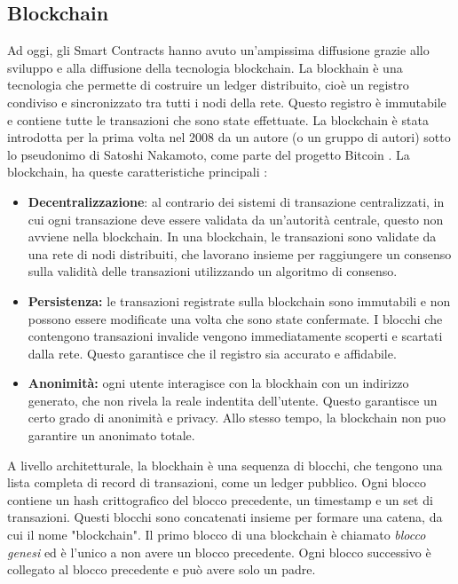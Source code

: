 \documentclass[../../Thesis.tex]{subfiles}
\begin{document}
\subsection{Blockchain}
Ad oggi, gli Smart Contracts hanno avuto un'ampissima diffusione grazie allo sviluppo  e alla diffusione della tecnologia blockchain. La blockhain è una tecnologia che permette di costruire un ledger distribuito, cioè un registro condiviso e sincronizzato tra tutti i nodi della rete. Questo registro è immutabile e contiene tutte le transazioni che sono state effettuate. La blockchain è stata introdotta per la prima volta nel 2008 da un autore (o un gruppo di autori) sotto lo pseudonimo di Satoshi Nakamoto, come parte del progetto Bitcoin \cite{Bitcoin}. La blockchain, ha queste caratteristiche principali \cite{Blockchain}:
\begin{itemize}
    \item \textbf{Decentralizzazione}: al contrario dei sistemi di transazione centralizzati, in cui ogni transazione deve essere validata da un'autorità centrale, questo non avviene nella blockchain. In una blockchain, le transazioni sono validate da una rete di nodi distribuiti, che lavorano insieme per raggiungere un consenso sulla validità delle transazioni utilizzando un algoritmo di consenso.
    \item \textbf{Persistenza:} le transazioni registrate sulla blockchain sono immutabili e non possono essere modificate una volta che sono state confermate. I blocchi che contengono transazioni invalide vengono immediatamente scoperti e scartati dalla rete. Questo garantisce che il registro sia accurato e affidabile.
    \item \textbf{Anonimità:} ogni utente interagisce con la blockhain con un indirizzo generato, che non rivela la reale indentita dell'utente. Questo garantisce un certo grado di anonimità e privacy. Allo stesso tempo, la blockchain non puo garantire un anonimato totale. 
\end{itemize}
A livello architetturale, la blockhain è una sequenza di blocchi, che tengono una lista completa di record di transazioni, come un ledger pubblico. Ogni blocco contiene un hash crittografico del blocco precedente, un timestamp e un set di transazioni. Questi blocchi sono concatenati insieme per formare una catena, da cui il nome "blockchain". Il primo blocco di una blockchain è chiamato \emph{blocco genesi} ed è l'unico a non avere un blocco precedente. Ogni blocco successivo è collegato al blocco precedente e può avere solo un padre.\\
\end{document}
